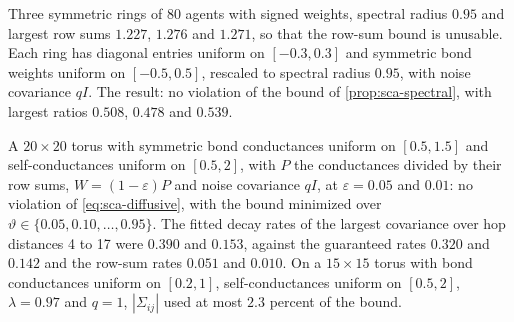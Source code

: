 \begin{numcheck}\label{chk:sca-spectral}
Three symmetric rings of 80 agents with signed weights, spectral radius $0.95$ and largest row sums $1.227$, $1.276$ and $1.271$, so that the row-sum bound is unusable. Each ring has diagonal entries uniform on $[-0.3,0.3]$ and symmetric bond weights uniform on $[-0.5,0.5]$, rescaled to spectral radius $0.95$, with noise covariance $qI$. The result: no violation of the bound of \cref{prop:sca-spectral}, with largest ratios $0.508$, $0.478$ and $0.539$.
\end{numcheck}

\begin{numcheck}\label{chk:sca-diffusive}
A $20\times20$ torus with symmetric bond conductances uniform on $[0.5,1.5]$ and self-conductances uniform on $[0.5,2]$, with $P$ the conductances divided by their row sums, $W=(1-\varepsilon)P$ and noise covariance $qI$, at $\varepsilon=0.05$ and $0.01$: no violation of \eqref{eq:sca-diffusive}, with the bound minimized over $\vartheta\in\{0.05,0.10,\dots,0.95\}$. The fitted decay rates of the largest covariance over hop distances 4 to 17 were $0.390$ and $0.153$, against the guaranteed rates $0.320$ and $0.142$ and the row-sum rates $0.051$ and $0.010$. On a $15\times15$ torus with bond conductances uniform on $[0.2,1]$, self-conductances uniform on $[0.5,2]$, $\lambda=0.97$ and $q=1$, $|\Sigma_{ij}|$ used at most $2.3$ percent of the bound.
\end{numcheck}

